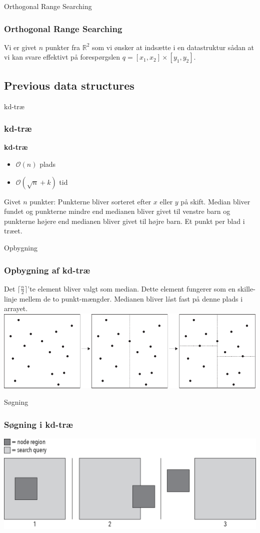 \documentclass[pdf]{beamer}
\begin{document}
\begin{frame}{Orthogonal Range Searching}
  \frametitle{Orthogonal Range Searching}

  Vi er givet $n$ punkter fra $\mathbb{R}^2$ som vi ønsker at indsætte i en datastruktur sådan at vi kan svare effektivt på forespørgslen $q = [x_1, x_2] \times [y_1, y_2]$.
\end{frame}

\subsection{Previous data structures}

\begin{frame}{kd-træ}
  \frametitle{kd-træ}
  \textbf{kd-træ}
  \begin{itemize}
    \item $\mathcal{O}(n)$ plads
    \item $\mathcal{O}(\sqrt{n} + k)$ tid
  \end{itemize}
  Givet $n$ punkter: Punkterne bliver sorteret efter $x$ eller $y$ på skift. Median bliver fundet og punkterne mindre end medianen bliver givet til venstre barn og punkterne højere end medianen bliver givet til højre barn. Et punkt per blad i træet.
\end{frame}

\begin{frame}{Opbygning}
  \frametitle{Opbygning af kd-træ}
  Det $\lceil \frac{n}{2} \rceil$'te element bliver valgt som median. Dette element fungerer som en skille-linje mellem de to punkt-mængder. Medianen bliver låst fast på denne plads i arrayet.
  \includegraphics[scale=0.75]{pictures/kd_subdivision-eps-converted-to.pdf}
\end{frame}


\begin{frame}{Søgning}
  \frametitle{Søgning i kd-træ}
  \begin{center}
    \includegraphics[scale=0.75]{pictures/search_query_overlap.png}
  \end{center}
\end{frame}
\end{document}
